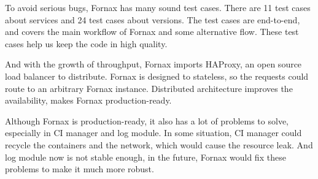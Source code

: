 \begin{bigabstract}
To avoid serious bugs, Fornax has many sound test cases. There are 11 test cases about services and 24 test cases about versions. The test cases are end-to-end, and covers the main workflow of Fornax and some alternative flow. These test cases help us keep the code in high quality.

And with the growth of throughput, Fornax imports HAProxy, an open source load balancer to distribute. Fornax is designed to stateless, so the requests could route to an arbitrary Fornax instance. Distributed architecture improves the availability, makes Fornax production-ready.

Although Fornax is production-ready, it also has a lot of problems to solve, especially in CI manager and log module. In some situation, CI manager could recycle the containers and the network, which would cause the resource leak. And log module now is not stable enough, in the future, Fornax would fix these problems to make it much more robust.
\end{bigabstract}
